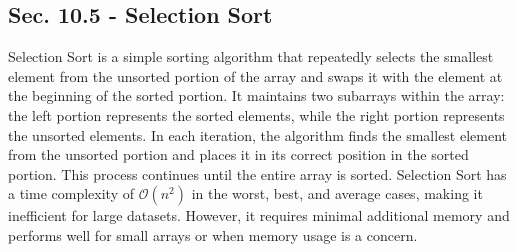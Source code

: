 \subsection*{Sec. 10.5 - Selection Sort}

Selection Sort is a simple sorting algorithm that repeatedly selects the smallest element from the unsorted portion of the array and swaps it with the element at the beginning of the sorted portion. It maintains two subarrays within the array: the left portion represents the sorted elements, while the right portion represents the unsorted elements. 
In each iteration, the algorithm finds the smallest element from the unsorted portion and places it in its correct position in the sorted portion. This process continues until the entire array is sorted. Selection Sort has a time complexity of $\mathcal{O}(n^2)$ in the worst, best, and average cases, making it inefficient for large datasets. However, 
it requires minimal additional memory and performs well for small arrays or when memory usage is a concern.

